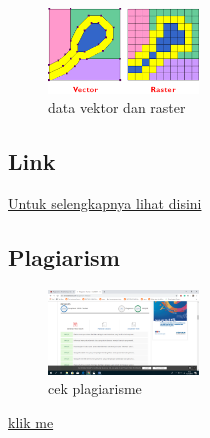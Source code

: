 \begin{figure}[H]
	\includegraphics[width=4cm]{figures/1174096/1/vektordanraster.png}
	\centering
	\caption{data vektor dan raster}
\end{figure}
\subsection{Link}
\href{https://youtu.be/94y4uCmKc1Q}{Untuk selengkapnya lihat disini}

\subsection{Plagiarism}
\begin{figure}[H]
	\includegraphics[width=4cm]{figures/1174096/1/plagiarisme.png}
	\centering
	\caption{cek plagiarisme}
\end{figure}

\href{https://www.google.com/}{klik me}